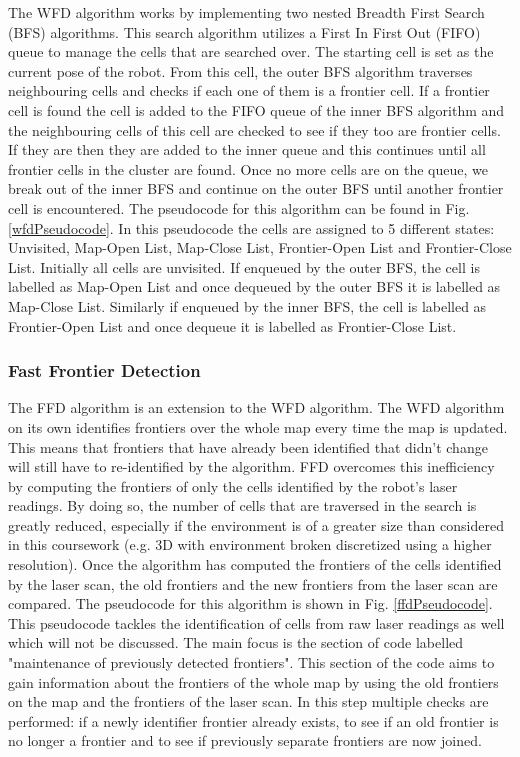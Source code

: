 \documentclass[a4paper,12pt]{article}
\begin{document}
				The WFD algorithm works by implementing two nested Breadth First Search (BFS) algorithms. This search algorithm utilizes a First In First Out (FIFO) queue to manage the cells that are searched over. The starting cell is set as the current pose of the robot. From this cell, the outer BFS algorithm traverses neighbouring cells and checks if each one of them is a frontier cell. If a frontier cell is found the cell is added to the FIFO queue of the inner BFS algorithm and the neighbouring cells of this cell are checked to see if they too are frontier cells. If they are then they are added to the inner queue and this continues until all frontier cells in the cluster are found. Once no more cells are on the queue, we break out of the inner BFS and continue on the outer BFS until another frontier cell is encountered. The pseudocode for this algorithm can be found in Fig. \ref{wfdPseudocode}. In this pseudocode the cells are assigned to 5 different states: Unvisited, Map-Open List, Map-Close List, Frontier-Open List and Frontier-Close List. Initially all cells are unvisited. If enqueued by the outer BFS, the cell is labelled as Map-Open List and once dequeued by the outer BFS it is labelled as Map-Close List. Similarly if enqueued by the inner BFS, the cell is labelled as Frontier-Open List and once dequeue it is labelled as Frontier-Close List. 
				
				\subsubsection{Fast Frontier Detection}

				The FFD algorithm is an extension to the WFD algorithm. The WFD algorithm on its own identifies frontiers over the whole map every time the map is updated. This means that frontiers that have already been identified that didn't change will still have to re-identified by the algorithm. FFD overcomes this inefficiency by computing the frontiers of only the cells identified by the robot's laser readings. By doing so, the number of cells that are traversed in the search is greatly reduced, especially if the environment is of a greater size than considered in this coursework (e.g. 3D with environment broken discretized using a higher resolution). Once the algorithm has computed the frontiers of the cells identified by the laser scan, the old frontiers and the new frontiers from the laser scan are compared. The pseudocode for this algorithm is shown in Fig. \ref{ffdPseudocode}. This pseudocode tackles the identification of cells from raw laser readings as well which will not be discussed. The main focus is the section of code labelled "maintenance of previously detected frontiers". This section of the code aims to gain information about the frontiers of the whole map by using the old frontiers on the map and the frontiers of the laser scan. In this step multiple checks are performed: if a newly identifier frontier already exists, to see if an old frontier is no longer a frontier and to see if previously separate frontiers are now joined. 
				
\end{document}
